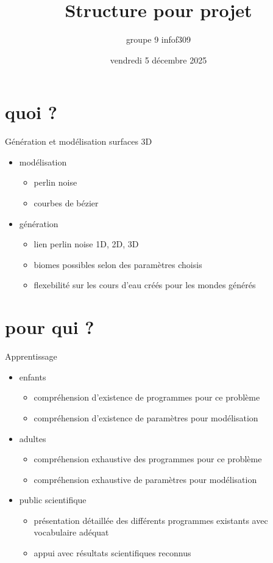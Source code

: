 \documentclass{beamer}
\title{Structure pour projet}
\author{groupe 9 infof309}
\date{vendredi 5 décembre 2025}
\begin{document}
\begin{frame}
\titlepage
\end{frame}

\section{quoi ?}
\begin{frame}{Génération et modélisation surfaces 3D}
\begin{itemize}
	\item modélisation
	\begin{itemize}
		\item perlin noise 
		\item courbes de bézier
	\end{itemize}
	\item génération
	\begin{itemize}
		\item lien perlin noise 1D, 2D, 3D
		\item biomes possibles selon des paramètres choisis
		\item flexebilité sur les cours d'eau créés pour les mondes générés
	\end{itemize}
\end{itemize}
\end{frame}

\section{pour qui ?}
\begin{frame}{Apprentissage}
\begin{itemize}
	\item enfants
	\begin{itemize}
		\item compréhension d'existence de programmes pour ce problème
		\item compréhension d'existence de paramètres pour modélisation 
	\end{itemize}
	\item adultes
	\begin{itemize}
		\item compréhension exhaustive des programmes pour ce problème
		\item compréhension exhaustive de paramètres pour modélisation 
	\end{itemize}
	\item public scientifique
	\begin{itemize}
		\item présentation détaillée des différents programmes existants avec vocabulaire adéquat
		\item appui avec résultats scientifiques reconnus  
	\end{itemize}
\end{itemize}
\end{frame}
\end{document}
